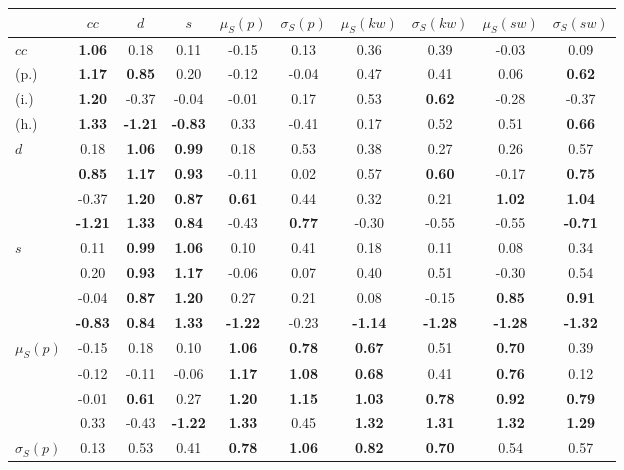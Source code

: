 \begin{table*}[h!]
\begin{center}
\begin{tabular}{| l || c | c | c | c | c | c | c | c | c |}\hline
 & $cc$ & $d$ & $s$ & $\mu_S(p)$ & $\sigma_S(p)$ & $\mu_S(kw)$ & $\sigma_S(kw)$ & $\mu_S(sw)$ & $\sigma_S(sw)$ \\\hline\hline
$cc$ & {\bf 1.06} & 0.18 & 0.11 & -0.15 & 0.13 & 0.36 & 0.39 & -0.03 & 0.09 \\
(p.) & {\bf 1.17} & {\bf 0.85} & 0.20 & -0.12 & -0.04 & 0.47 & 0.41 & 0.06 & {\bf 0.62} \\
(i.) & {\bf 1.20} & -0.37 & -0.04 & -0.01 & 0.17 & 0.53 & {\bf 0.62} & -0.28 & -0.37 \\
(h.) & {\bf 1.33} & {\bf -1.21} & {\bf -0.83} & 0.33 & -0.41 & 0.17 & 0.52 & 0.51 & {\bf 0.66} \\\hline
$d$ & 0.18 & {\bf 1.06} & {\bf 0.99} & 0.18 & 0.53 & 0.38 & 0.27 & 0.26 & 0.57 \\
 & {\bf 0.85} & {\bf 1.17} & {\bf 0.93} & -0.11 & 0.02 & 0.57 & {\bf 0.60} & -0.17 & {\bf 0.75} \\
 & -0.37 & {\bf 1.20} & {\bf 0.87} & {\bf 0.61} & 0.44 & 0.32 & 0.21 & {\bf 1.02} & {\bf 1.04} \\
 & {\bf -1.21} & {\bf 1.33} & {\bf 0.84} & -0.43 & {\bf 0.77} & -0.30 & -0.55 & -0.55 & {\bf -0.71} \\\hline
$s$ & 0.11 & {\bf 0.99} & {\bf 1.06} & 0.10 & 0.41 & 0.18 & 0.11 & 0.08 & 0.34 \\
 & 0.20 & {\bf 0.93} & {\bf 1.17} & -0.06 & 0.07 & 0.40 & 0.51 & -0.30 & 0.54 \\
 & -0.04 & {\bf 0.87} & {\bf 1.20} & 0.27 & 0.21 & 0.08 & -0.15 & {\bf 0.85} & {\bf 0.91} \\
 & {\bf -0.83} & {\bf 0.84} & {\bf 1.33} & {\bf -1.22} & -0.23 & {\bf -1.14} & {\bf -1.28} & {\bf -1.28} & {\bf -1.32} \\\hline
$\mu_S(p)$ & -0.15 & 0.18 & 0.10 & {\bf 1.06} & {\bf 0.78} & {\bf 0.67} & 0.51 & {\bf 0.70} & 0.39 \\
 & -0.12 & -0.11 & -0.06 & {\bf 1.17} & {\bf 1.08} & {\bf 0.68} & 0.41 & {\bf 0.76} & 0.12 \\
 & -0.01 & {\bf 0.61} & 0.27 & {\bf 1.20} & {\bf 1.15} & {\bf 1.03} & {\bf 0.78} & {\bf 0.92} & {\bf 0.79} \\
 & 0.33 & -0.43 & {\bf -1.22} & {\bf 1.33} & 0.45 & {\bf 1.32} & {\bf 1.31} & {\bf 1.32} & {\bf 1.29} \\\hline
$\sigma_S(p)$ & 0.13 & 0.53 & 0.41 & {\bf 0.78} & {\bf 1.06} & {\bf 0.82} & {\bf 0.70} & 0.54 & 0.57 \\

\end{tabular}
\end{center}
\end{table*}
